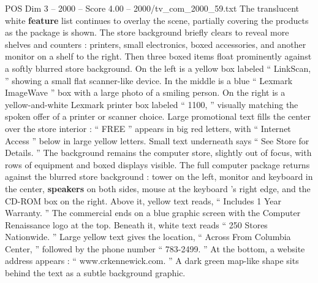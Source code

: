 \begin{textsample}{POS Dim 3 – 2000 – Score 4.00 – 2000/tv\_com\_2000\_59.txt}
The translucent white \textbf{feature} list continues to overlay the scene, partially covering the products as the package is shown.
The store background briefly clears to reveal more shelves and counters : printers, small electronics, boxed accessories, and another monitor on a shelf to the right.
Then three boxed items float prominently against a softly blurred store background.
On the left is a yellow box labeled “ LinkScan, ” showing a small flat scanner-like device.
In the middle is a blue “ Lexmark ImageWave ” box with a large photo of a smiling person.
On the right is a yellow-and-white Lexmark printer box labeled “ 1100, ” visually matching the spoken offer of a printer or scanner choice.
Large promotional text fills the center over the store interior : “ FREE ” appears in big red letters, with “ Internet Access ” below in large yellow letters.
Small text underneath says “ See Store for Details. ” The background remains the computer store, slightly out of focus, with rows of equipment and boxed displays visible.
The full computer package returns against the blurred store background : tower on the left, monitor and keyboard in the center, \textbf{speakers} on both sides, mouse at the keyboard ’s right edge, and the CD-ROM box on the right.
Above it, yellow text reads, “ Includes 1 Year Warranty. ” The commercial ends on a blue graphic screen with the Computer Renaissance logo at the top.
Beneath it, white text reads “ 250 Stores Nationwide. ” Large yellow text gives the location, “ Across From Columbia Center, ” followed by the phone number “ 783-2499. ” At the bottom, a website address appears : “ www.crkennewick.com. ” A dark green map-like shape sits behind the text as a subtle background graphic.

\end{textsample}

